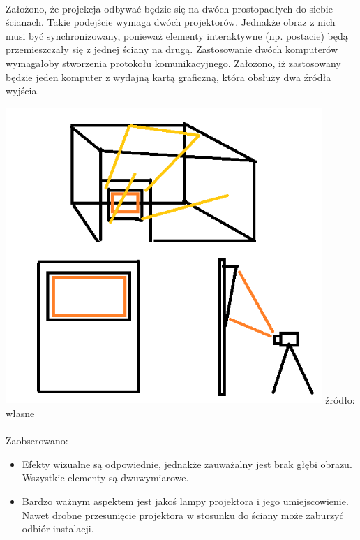 \paragraph{}
Założono, że projekcja odbywać będzie się na dwóch prostopadłych do siebie ścianach. Takie podejście wymaga dwóch projektorów. Jednakże obraz z nich musi być synchronizowany, ponieważ elementy interaktywne (np. postacie) będą przemieszczały się z jednej ściany na drugą. Zastosowanie dwóch komputerów wymagałoby stworzenia protokołu komunikacyjnego. Założono, iż zastosowany będzie jeden komputer z wydajną kartą graficzną, która obsłuży dwa źródła wyjścia.

\begin{center}
\includegraphics[width=0.9\textwidth]{images/mappingv1.png}
\small {źródło: własne }
\end{center}

\paragraph{}
Zaobserowano:
\begin{itemize}
	\item Efekty wizualne są odpowiednie, jednakże zauważalny jest brak głębi obrazu. Wszystkie elementy są dwuwymiarowe.
	\item Bardzo ważnym aspektem jest jakoś lampy projektora i jego umiejscowienie. Nawet drobne przesunięcie projektora w stosunku do ściany może zaburzyć odbiór instalacji.
\end{itemize}
